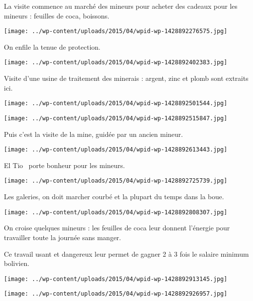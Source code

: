  La visite commence au marché des mineurs pour acheter des cadeaux pour les mineurs : feuilles de coca, boissons.
\begin{center} \texttt{[image: ../wp-content/uploads/2015/04/wpid-wp-1428892276575.jpg]} \end{center}

\pagebreak
 On enfile la tenue de protection. 
\begin{center} \texttt{[image: ../wp-content/uploads/2015/04/wpid-wp-1428892402383.jpg]} \end{center}

 Visite d'une usine de traitement des minerais : argent, zinc et plomb sont extraits ici. 
\begin{center} \texttt{[image: ../wp-content/uploads/2015/04/wpid-wp-1428892501544.jpg]} \end{center}
\begin{center} \texttt{[image: ../wp-content/uploads/2015/04/wpid-wp-1428892515847.jpg]} \end{center}

 Puis c'est la visite de la mine, guidée par un ancien mineur. 
\begin{center} \texttt{[image: ../wp-content/uploads/2015/04/wpid-wp-1428892613443.jpg]} \end{center}

\pagebreak
 \og El Tio \fg\ porte bonheur pour les mineurs. 
\begin{center} \texttt{[image: ../wp-content/uploads/2015/04/wpid-wp-1428892725739.jpg]} \end{center}

Les galeries, on doit marcher courbé et la plupart du temps dans la boue. 
\begin{center} \texttt{[image: ../wp-content/uploads/2015/04/wpid-wp-1428892808307.jpg]} \end{center}

 On croise quelques mineurs : les feuilles de coca leur donnent l'énergie pour travailler toute la journée sans manger. 

 Ce travail usant et dangereux leur permet de gagner 2 à 3 fois le salaire minimum bolivien. 
\begin{center} \texttt{[image: ../wp-content/uploads/2015/04/wpid-wp-1428892913145.jpg]} \end{center}
\begin{center} \texttt{[image: ../wp-content/uploads/2015/04/wpid-wp-1428892926957.jpg]} \end{center}